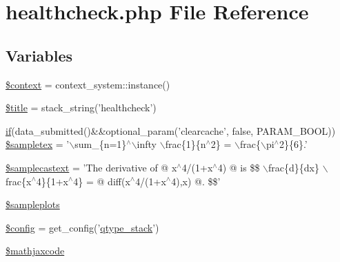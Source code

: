 \hypertarget{healthcheck_8php}{
\section{healthcheck.php File Reference}
\label{healthcheck_8php}
}
\subsection*{Variables}
\begin{DoxyCompactItemize}
\item 
\hyperlink{healthcheck_8php_ae05dedb802ada0155efdece2044fed64}{\$context} = context\_\-system::instance()
\item 
\hyperlink{healthcheck_8php_ada57e7bb7c152edad18fe2f166188691}{\$title} = stack\_\-string('healthcheck')
\item 
\hyperlink{caschat_8php_a2018ad56dfaea89ba7f32f4f912be98f}{if}(data\_\-submitted()\&\&optional\_\-param('clearcache', false, PARAM\_\-BOOL)) \hyperlink{healthcheck_8php_a0bf3c4d1490f0f3f572155c665b3a132}{\$sampletex} = '$\backslash$sum\_\-\{n=1\}$^\wedge$$\backslash$infty $\backslash$frac\{1\}\{n$^\wedge$2\} = $\backslash$frac\{$\backslash$pi$^\wedge$2\}\{6\}.'
\item 
\hyperlink{healthcheck_8php_ad8590b7afabc52a690a1e8e5859f3155}{\$samplecastext} = 'The derivative of @ x$^\wedge$4/(1+x$^\wedge$4) @ is \$\$ $\backslash$frac\{d\}\{dx\} $\backslash$frac\{x$^\wedge$4\}\{1+x$^\wedge$4\} = @ diff(x$^\wedge$4/(1+x$^\wedge$4),x) @. \$\$'
\item 
\hyperlink{healthcheck_8php_a7f52428d8b09f3246672a650e29dbe13}{\$sampleplots}
\item 
\hyperlink{healthcheck_8php_a49c7011be9c979d9174c52a8b83e5d8e}{\$config} = get\_\-config('\hyperlink{classqtype__stack}{qtype\_\-stack}')
\item 
\hyperlink{healthcheck_8php_a8c8e2564bf536b8e2c30911f70fb7a3e}{\$mathjaxcode}
\end{DoxyCompactItemize}


